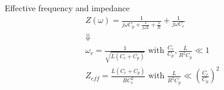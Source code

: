 \documentclass[../main.tex]{subfiles}
\begin{document}

\begin{frame}{Effective frequency and impedance}
\begin{gather*}
    Z(\omega) = \frac{1}{j \omega C_{p} + \frac{1}{j \omega L} + \frac{1}{R}}
        + \frac{1}{j \omega C_{c}}\\
    \Downarrow\\
    \omega_{r} = \frac{1}{\sqrt{L(C_{c} + C_{p})}} \text{ with } \frac{C_{c}}{C_{p}}, \frac{L}{R^2 C_{p}} \ll 1 \\
    Z_{eff} = \frac{L(C_{c}+C_{p})}{R C_{c}^2} \text{ with } \frac{L}{R^2 C_{p}} \ll \left(\frac{C_{c}}{C_{p}}\right)^2
\end{gather*}
\end{frame}


% 

% 
\end{document}
